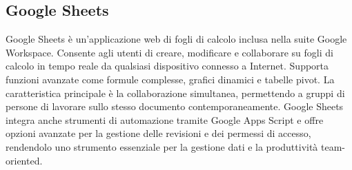 \vspace{2em}
\subsection*{Google Sheets}
\par Google Sheets è un'applicazione web di fogli di calcolo inclusa nella suite Google Workspace. Consente agli utenti di creare, modificare e collaborare su fogli di calcolo in tempo reale da qualsiasi dispositivo connesso a Internet. Supporta funzioni avanzate come formule complesse, grafici dinamici e tabelle pivot. La caratteristica principale è la collaborazione simultanea, permettendo a gruppi di persone di lavorare sullo stesso documento contemporaneamente. Google Sheets integra anche strumenti di automazione tramite Google Apps Script e offre opzioni avanzate per la gestione delle revisioni e dei permessi di accesso, rendendolo uno strumento essenziale per la gestione dati e la produttività team-oriented.
